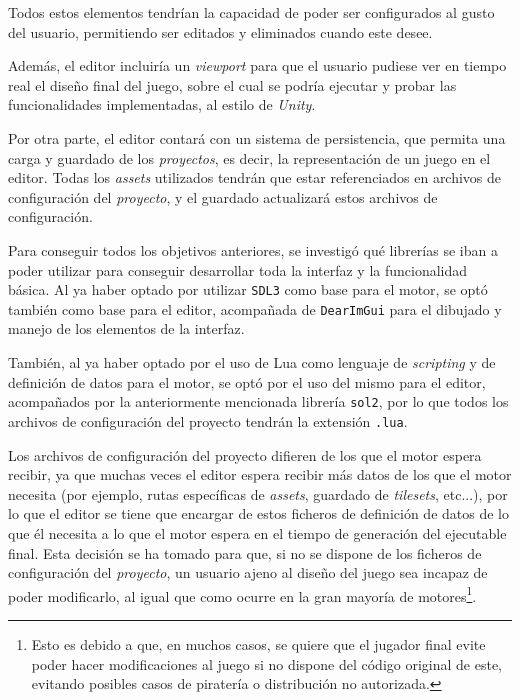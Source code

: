 Todos estos elementos tendrían la capacidad de poder ser configurados al gusto del usuario, permitiendo ser editados y eliminados cuando este desee.

\medskip

Además, el editor incluiría un \textit{viewport} para que el usuario pudiese ver en tiempo real el diseño final del juego, sobre el cual se podría ejecutar y probar las funcionalidades implementadas, al estilo de \textit{Unity}.

\medskip

Por otra parte, el editor contará con un sistema de persistencia, que permita una carga y guardado de los \textit{proyectos}, es decir, la representación de un juego en el editor. Todas los \textit{assets} utilizados tendrán que estar referenciados en archivos de configuración del \textit{proyecto}, y el guardado actualizará estos archivos de configuración.

\bigskip

Para conseguir todos los objetivos anteriores, se investigó qué librerías se iban a poder utilizar para conseguir desarrollar toda la interfaz y la funcionalidad básica. Al ya haber optado por utilizar \texttt{SDL3} como base para el motor, se optó también como base para el editor, acompañada de \texttt{DearImGui} para el dibujado y manejo de los elementos de la interfaz.

\medskip

También, al ya haber optado por el uso de Lua como lenguaje de \textit{scripting} y de definición de datos para el motor, se optó por el uso del mismo para el editor, acompañados por la anteriormente mencionada librería \texttt{sol2}, por lo que todos los archivos de configuración del proyecto tendrán la extensión \texttt{.lua}.

\smallskip

Los archivos de configuración del proyecto difieren de los que el motor espera recibir, ya que muchas veces el editor espera recibir más datos de los que el motor necesita (por ejemplo, rutas específicas de \textit{assets}, guardado de \textit{tilesets}, etc...), por lo que el editor se tiene que encargar de  estos ficheros de definición de datos de lo que él necesita a lo que el motor espera en el tiempo de generación del ejecutable final. Esta decisión se ha tomado para que, si no se dispone de los ficheros de configuración del \textit{proyecto}, un usuario ajeno al diseño del juego sea incapaz de poder modificarlo, al igual que como ocurre en la gran mayoría de motores\footnote{Esto es debido a que, en muchos casos, se quiere que el jugador final evite poder hacer modificaciones al juego si no dispone del código original de este, evitando posibles casos de piratería o distribución no autorizada.}.

